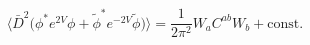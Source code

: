 \begin{equation}\label{Full_Anomaly}
\Big\langle \bar D^2 \Big(\phi^* e^{2V}\phi
+ \tilde\phi^* e^{-2V}\tilde\phi\Big)\Big\rangle
= \frac{1}{2\pi^2} W_a C^{ab} W_b + \mbox{const}.
\end{equation}

